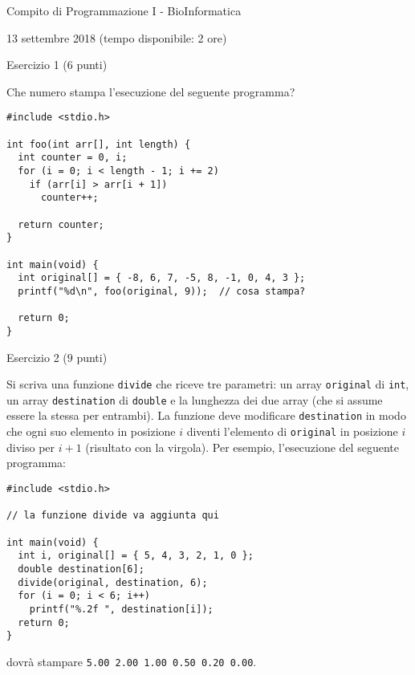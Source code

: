 \documentclass[12pt]{article}
\begin{document}
\begin{center}{\LARGE Compito di Programmazione I - BioInformatica}\\
\vspace*{-2ex}
\begin{center}
  \large 13 settembre 2018 (tempo disponibile: 2 ore)
\end{center}
\end{center}

\begin{center}{\Large Esercizio 1} ($6$ punti)
\end{center}
Che numero stampa l'esecuzione del seguente programma?
\begin{lstlisting}
#include <stdio.h>

int foo(int arr[], int length) {
  int counter = 0, i;
  for (i = 0; i < length - 1; i += 2)
    if (arr[i] > arr[i + 1])
      counter++;

  return counter;
}

int main(void) {
  int original[] = { -8, 6, 7, -5, 8, -1, 0, 4, 3 };
  printf("%d\n", foo(original, 9));  // cosa stampa?

  return 0;
}
\end{lstlisting}

\vspace*{1ex}
\begin{center}{\Large Esercizio 2} ($9$ punti)
\end{center}
Si scriva una funzione \texttt{divide} che riceve tre parametri: un array
\texttt{original} di \texttt{int}, un array \texttt{destination} di \texttt{double}
e la lunghezza dei due array (che si assume essere la stessa per entrambi).
La funzione deve modificare \texttt{destination} in modo che ogni suo elemento
in posizione $i$ diventi l'elemento di \texttt{original} in posizione $i$
diviso per $i + 1$ (risultato con la virgola). Per esempio, l'esecuzione
del seguente programma:

\begin{lstlisting}
#include <stdio.h>

// la funzione divide va aggiunta qui

int main(void) {
  int i, original[] = { 5, 4, 3, 2, 1, 0 };
  double destination[6];
  divide(original, destination, 6);
  for (i = 0; i < 6; i++)
    printf("%.2f ", destination[i]);
  return 0;
}
\end{lstlisting}
dovr\`a stampare \texttt{5.00 2.00 1.00 0.50 0.20 0.00}.
\newpage
\end{document}
